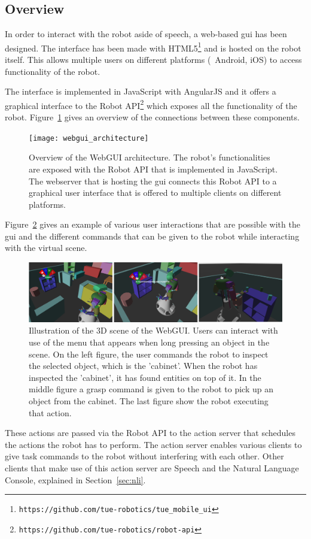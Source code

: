 \subsection*{Overview}

In order to interact with the robot aside of speech, a web-based \gls{gui} has been designed.
The interface has been made with HTML5\footnote{\texttt{https://github.com/tue-robotics/tue\_mobile\_ui}} and is hosted on the robot itself.
This allows multiple users on different platforms (\eg\ Android, iOS) to access functionality of the robot.

The interface is implemented in JavaScript with AngularJS and it offers a graphical interface to the Robot API\footnote{\texttt{https://github.com/tue-robotics/robot-api}} which exposes all the functionality of the robot.
Figure~\ref{fig:webgui_architecture} gives an overview of the connections between these components.

\begin{figure}[H]
	\texttt{[image: webgui\_architecture]}
	\caption{
		Overview of the WebGUI architecture.
		The robot's functionalities are exposed with the Robot API that is implemented in JavaScript.
		The webserver that is hosting the \gls{gui} connects this Robot API to a graphical user interface that is offered to multiple clients on different platforms.}
	\label{fig:webgui_architecture}
\end{figure}

Figure~\ref{fig:gui_actions} gives an example of various user interactions that are possible with the \gls{gui} and the different commands that can be given to the robot while interacting with the virtual scene.

\begin{figure}[H]
	\includegraphics[width=\linewidth]{Figures/gui_actions}
	\caption{
		Illustration of the 3D scene of the WebGUI.
		Users can interact with use of the menu that appears when long pressing an object in the scene.
		On the left figure, the user commands the robot to inspect the selected object, which is the 'cabinet'.
		When the robot has inspected the 'cabinet', it has found entities on top of it.
		In the middle figure a grasp command is given to the robot to pick up an object from the cabinet.
		The last figure show the robot executing that action.}
	\label{fig:gui_actions}
\end{figure}

These actions are passed via the Robot API to the action server that schedules the actions the robot has to perform.
The action server enables various clients to give task commands to the robot without interfering with each other.
Other clients that make use of this action server are Speech and the Natural Language Console, explained in Section~\ref{sec:nli}.
